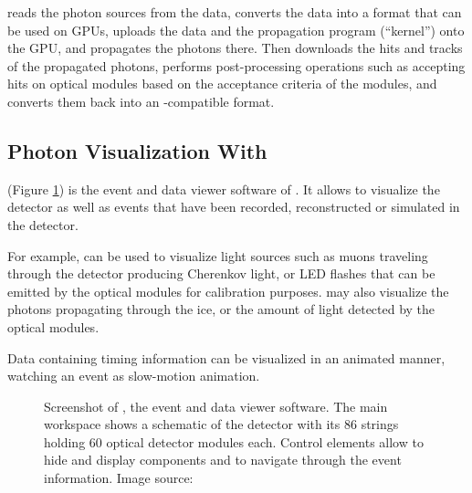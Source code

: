 \clsim reads the photon sources from the \icesim data, converts the data into a format that can be used on GPUs, uploads the data and the propagation program (``kernel'') onto the GPU, and propagates the photons there. Then \clsim downloads the hits and tracks of the propagated photons, performs post-processing operations such as accepting hits on optical modules based on the acceptance criteria of the modules, and converts them back into an \icesim-compatible format.





\subsection{Photon Visualization With \steamshovel}

\steamshovel (Figure \ref{fig:steamshovel}) is the event and data viewer software of \icecube. It allows to visualize the \icecube detector as well as events that have been recorded, reconstructed or simulated in the detector.

For example, \steamshovel can be used to visualize light sources such as muons traveling through the detector producing Cherenkov light, or LED flashes that can be emitted by the optical modules for calibration purposes. \steamshovel may also visualize the photons propagating through the ice, or the amount of light detected by the optical modules.

Data containing timing information can be visualized in an animated manner, watching an event as slow-motion animation.

\begin{figure}
  \caption{Screenshot of \steamshovel, the \icecube event and data viewer software. The main workspace shows a schematic of the \icecube detector with its 86 strings holding 60 optical detector modules each. Control elements allow to hide and display components and to navigate through the event information. Image source: \cite{steamshoveldocumentation}}
  \label{fig:steamshovel}
\end{figure}

